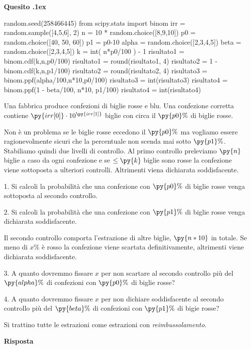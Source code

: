 \documentclass[11pt,twoside,a4paper]{article}
\newcounter{quesito}
\newenvironment{question}{\addtocounter{quesito}{1}\par\textbf{Quesito \thequesito.\kern1ex}}{\vspace{0.5\parskip}}
\newenvironment{answer}{\par\textbf{Risposta\quad}}{\vspace{\parskip}}
\begin{document}
\begin{question}
\def\Pr{{\rm Pr\,}}
\def\Ex{{\rm E\,}}
\def\Var{{\rm Var\,}}
\begin{pycode}
random.seed(258466445)
from scipy.stats import binom
irr = random.sample([4,5,6], 2)
n = 10 * random.choice([8,9,10])
p0 = random.choice([40, 50, 60])
p1 = p0-10
alpha =  random.choice([2,3,4,5])
beta =  random.choice([2,3,4,5])
k = int( n*p0/100 ) - 1
risultato1 = binom.cdf(k,n,p0/100)
risultato1 = round(risultato1, 4)
risultato2 = 1 - binom.cdf(k,n,p1/100)
risultato2 = round(risultato2, 4)
risultato3 = binom.ppf(alpha/100,n*10,p0/100)
risultato3 = int(risultato3)
risultato4 = binom.ppf(1 - beta/100, n*10, p1/100)
risultato4 = int(risultato4)
\end{pycode}
Una fabbrica produce confezioni di biglie rosse e blu. Una confezione corretta contiene $\py{irr[0]}\cdot 10^{\py{irr[1]}}$ biglie con circa il $\py{p0}\%$ di biglie rosse. 

Non è un problema se le biglie rosse eccedono il $\py{p0}\%$ ma vogliamo essere ragionevolmente sicuri che la percentuale non scenda mai sotto $\py{p1}\%$.  Stabiliamo quindi due livelli di controllo. 
Al primo controllo preleviamo $\py{n}$ biglie a caso da ogni confezione e se $\le\py{k}$ biglie sono rosse la confezione viene sottoposta a ulteriori controlli. Altrimenti viena dichiarata soddisfacente.

1. Si calcoli la probabilità che una confezione con $\py{p0}\%$ di biglie rosse venga sottoposta al secondo controllo.

2. Si calcoli la probabilità che una confezione con $\py{p1}\%$ di biglie rosse venga dichiarata soddisfacente.

Il secondo controllo comporta l'estrazione di altre biglie,  $\py{n*10}$ in totale. Se meno di $x\%$ è rosso la confezione viene scartata definitivamente, altrimenti viene dichiarata soddisfacente.

3. A quanto dovremmo fissare $x$ per non scartare al secondo controllo più del $\py{alpha}\%$ di confezioni con $\py{p0}\%$ di biglie rosse?

4. A quanto dovremmo fissare $x$ per non dichiare soddisfacente al secondo controllo più del $\py{beta}\%$ di confezioni con $\py{p1}\%$ di bigie rosse?

Si trattino tutte le estrazioni come estrazioni con \textit{reimbussolamento}.

\begin{answer}



\end{answer}
\end{question}
\end{document}
